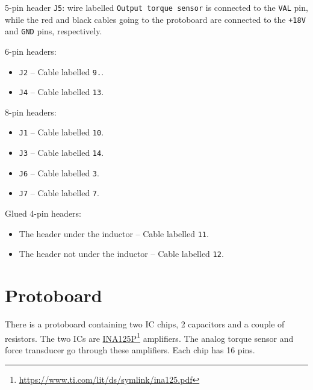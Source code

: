 5-pin header \verb|J5|: wire labelled \verb|Output torque sensor| is connected to the \verb|VAL| pin, while the red and black cables going to the protoboard are connected to the \verb|+18V| and \verb|GND| pins, respectively.

6-pin headers:
\begin{itemize}[noitemsep]
  \item \verb|J2| -- Cable labelled \verb|9.|.
  \item \verb|J4| -- Cable labelled \verb|13|.
\end{itemize}

8-pin headers:
\begin{itemize}[noitemsep]
  \item \verb|J1| -- Cable labelled \verb|10|.
  \item \verb|J3| -- Cable labelled \verb|14|.
  \item \verb|J6| -- Cable labelled \verb|3|.
  \item \verb|J7| -- Cable labelled \verb|7|.
\end{itemize}

Glued 4-pin headers:
\begin{itemize}[noitemsep]
  \item The header under the inductor -- Cable labelled \verb|11|.
  \item The header not under the inductor -- Cable labelled \verb|12|.
\end{itemize}

\section{Protoboard}
There is a protoboard containing two IC chips, 2 capacitors and a couple of resistors. The two ICs are \href{https://www.ti.com/lit/ds/symlink/ina125.pdf}{INA125P}\footnote{\href{https://www.ti.com/lit/ds/symlink/ina125.pdf}{https://www.ti.com/lit/ds/symlink/ina125.pdf}} amplifiers. The analog torque sensor and force transducer go through these amplifiers. Each chip has 16 pins.

